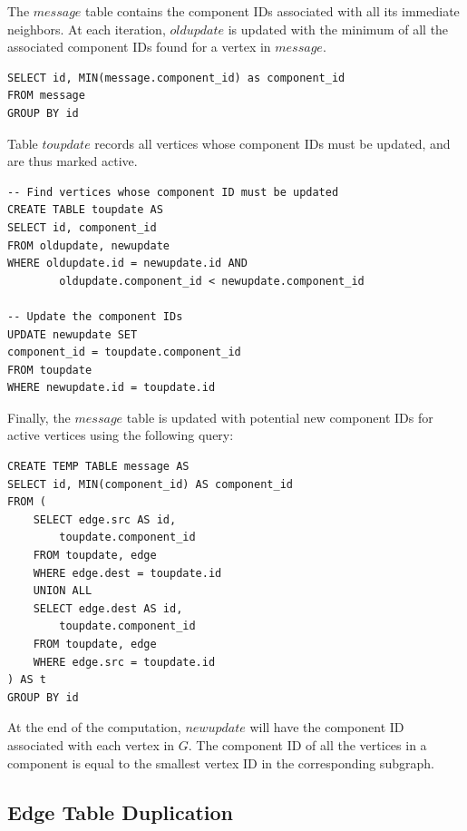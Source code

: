 The $message$ table contains the component IDs associated with all its
immediate neighbors. At each iteration, $oldupdate$ is updated with the
minimum of all the associated component IDs found for a vertex in $message$.

\begin{algorithm}
\begin{lstlisting}
SELECT id, MIN(message.component_id) as component_id
FROM message
GROUP BY id
\end{lstlisting}
\end{algorithm}

Table $toupdate$ records all vertices whose component IDs must be updated,
and are thus marked active.

\begin{algorithm}
\begin{lstlisting}
-- Find vertices whose component ID must be updated
CREATE TABLE toupdate AS
SELECT id, component_id
FROM oldupdate, newupdate
WHERE oldupdate.id = newupdate.id AND
        oldupdate.component_id < newupdate.component_id

-- Update the component IDs
UPDATE newupdate SET
component_id = toupdate.component_id
FROM toupdate
WHERE newupdate.id = toupdate.id
\end{lstlisting}
\end{algorithm}

Finally, the $message$ table is updated with potential new
component IDs for active vertices using the following query:

\begin{algorithm}
\label{alg:wcc:message}
\begin{lstlisting}
CREATE TEMP TABLE message AS
SELECT id, MIN(component_id) AS component_id
FROM (
    SELECT edge.src AS id,
        toupdate.component_id
    FROM toupdate, edge
    WHERE edge.dest = toupdate.id
    UNION ALL
    SELECT edge.dest AS id,
        toupdate.component_id
    FROM toupdate, edge
    WHERE edge.src = toupdate.id
) AS t
GROUP BY id
\end{lstlisting}
\end{algorithm}

At the end of the computation, $newupdate$ will have the component ID
associated with each vertex in $G$. The component ID of all the vertices
in a component is equal to the smallest vertex ID in the corresponding
subgraph.

\subsection{Edge Table Duplication} \label{sec:wcc:duplication}

